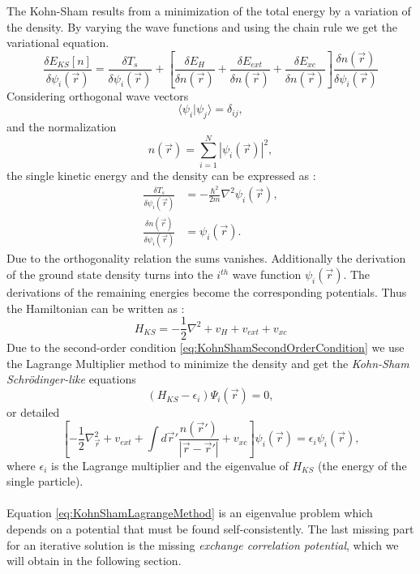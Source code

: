 		The Kohn-Sham results from a minimization of the total energy by a variation of the density. By varying the wave functions and using the chain rule we get the variational equation.
		\begin{equation}
			\label{eq:KohnShamVariationalEquation}
			\frac{\delta E_{KS}[n]}{\delta \psi_i(\vec r)} = \frac{\delta T_s}{\delta \psi_i(\vec r)} + \left[ \frac{\delta E_H}{\delta n(\vec r)} + \frac{\delta E_{ext}}{\delta n(\vec r)} + \frac{\delta E_{xc}}{\delta n(\vec r)} \right] \frac{\delta n(\vec r)}{ \delta \psi_i(\vec r)}
		\end{equation}
		Considering orthogonal wave vectors
		\begin{equation}
			\langle \psi_i | \psi_j \rangle = \delta_{ij},
		\end{equation}
		and the normalization
		\begin{equation}
			\label{eq:KohnShamSecondOrderCondition}
			n(\vec r) = \sum_{i=1}^{N}|\psi_i (\vec r)|^2,
		\end{equation}
		the single kinetic energy and the density can be expressed as :
		\begin{subequations}
			\begin{align}
				\frac{\delta T_s}{\delta \psi_i (\vec r)} &= - \frac{\hbar^2}{2m} \nabla^2 \psi_i (\vec r),\\
			    \frac{\delta n(\vec r)}{\delta \psi_i(\vec r)} &= \psi_i (\vec r).
			\end{align}
		\end{subequations}	
		Due to the orthogonality relation the sums vanishes. Additionally the derivation of the ground state density turns into the $i^{th}$ wave function $\psi_i(\vec r)$. The derivations of the remaining energies become the corresponding potentials. Thus the Hamiltonian can be written as : 
		\begin{equation}
			H_{KS} = -\frac{1}{2} \nabla^2 + v_{H} + v_{ext} + v_{xc}
		\end{equation}
		Due to the second-order condition \ref{eq:KohnShamSecondOrderCondition} we use the Lagrange Multiplier method to minimize the density and get the \textit{Kohn-Sham Schrödinger-like} equations
		\begin{equation}
			\label{eq:KohnShamLagrangeMethod}
			(H_{KS} - \epsilon_i)\Psi_i(\vec r) = 0,
		\end{equation}
		or detailed 
		\begin{equation}
			\left[ - \frac{1}{2} \nabla_\vec r^2 + v_{ext} + \int d\vec r' \frac{n(\vec r')}{|\vec r - \vec r'|} + v_{xc} \right] \psi_i (\vec r) = \epsilon_i \psi_i (\vec r),
		\end{equation}
		where $\epsilon_i$ is the Lagrange multiplier and the eigenvalue of $H_{KS}$ (the energy of the single particle). \\\\
		Equation \ref{eq:KohnShamLagrangeMethod} is an eigenvalue problem which depends on a potential that must be found self-consistently. The last missing part for an iterative solution is the missing \textit{exchange correlation potential}, which we will obtain in the following section.
		
